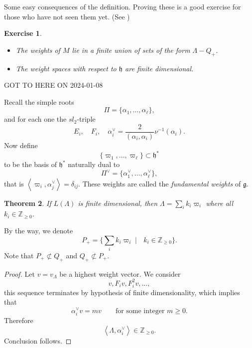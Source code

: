 \documentclass[12pt]{article}
\theoremstyle{plain}
\newtheorem{thm}{Theorem}[section]
\newtheorem{exer}[thm]{Exercise}
\theoremstyle{definition}
\numberwithin{equation}{section}
\newcommand{\al}{\alpha}
\newcommand{\La}{\Lambda}
\newcommand{\Z}{\mathbb{Z}}
\newcommand{\g}{\mathfrak{g}}
\newcommand{\h}{\mathfrak{h}}
\newcommand{\OO}{\mathcal{O}}
\begin{document}
Some easy consequences of the definition. Proving these is a good exercise for those who have not seen them yet. (See {\cite[Chapter 0]{humbgg}})
\begin{exer}
{\ }
\begin{itemize}
\item The weights of $M$ lie in a finite union of sets of the form $\La - Q_+$.

\item The weight spaces with respect to $\h$ are finite dimensional.
\end{itemize}
\end{exer}


{\color{red}GOT TO HERE ON 2024-01-08}






Recall the simple roots
\[
\Pi = \{\al_1, \ldots, \al_\ell\},
\]
and for each one the $sl_2$-triple
\[
E_i, \quad F_i, \quad \al_i^\vee = \frac{2}{(\al_i, \al_i)} \nu^{-1}(\al_i).
\]
Now define
\[
\{\varpi_1, \ldots, \varpi_\ell\} \subset \h^*
\]
to be the basis of $\h^*$ naturally dual to
\[
\Pi^\vee = \{\al_1^\vee, \ldots, \al_\ell^\vee\},
\]
that is $\left< \varpi_i, \al_j^\vee \right> = \delta_{ij}$. These weights are called the \emph{fundamental weights} of $\g$.


\begin{thm}
If $L(\La)$ is finite dimensional, then $\La = \sum_i k_i \varpi_i$ where all $k_i \in \Z_{\geq 0}$.
\end{thm}

By the way, we denote
\[
P_+ = \{ \sum_i k_i \varpi_i \mid \text{ $k_i \in \Z_{\geq 0}$}\}.
\]
Note that $P_+ \not\subset Q_+$ and $Q_+ \not\subset P_+$.


\begin{proof}
Let $v = v_\La$ be a highest weight vector. We consider
\[
v, F_i v, F_i^2 v, \ldots,
\]
this sequence terminates by hypothesis of finite dimensionality, which implies that
\[
\al_i^\vee v = m v \qquad \text{for some integer $m \geq 0$}.
\]
Therefore
\[
\left<\Lambda, \al_i^\vee\right> \in \Z_{\geq 0}.
\]
Conclusion follows.
\end{proof}
\end{document}

